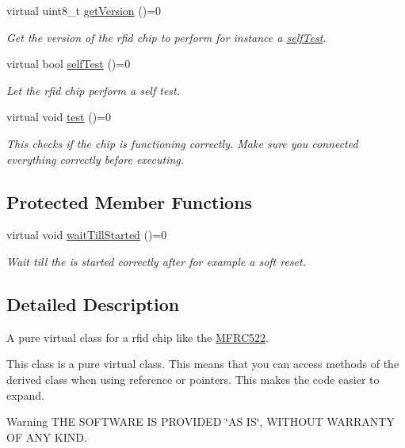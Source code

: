 \begin{DoxyCompactItemize}
virtual uint8\+\_\+t \mbox{\hyperlink{classrfid_a27619628e718bb781f912aead770079a}{get\+Version}} ()=0
\begin{DoxyCompactList}\small\item\em Get the version of the rfid chip to perform for instance a \mbox{\hyperlink{classrfid_a93e5430380a14fd652e7ca1ce6443198}{self\+Test}}. \end{DoxyCompactList}\item 
virtual bool \mbox{\hyperlink{classrfid_a93e5430380a14fd652e7ca1ce6443198}{self\+Test}} ()=0
\begin{DoxyCompactList}\small\item\em Let the rfid chip perform a self test. \end{DoxyCompactList}\item 
virtual void \mbox{\hyperlink{classrfid_adc4009859b77330fd5b3d0515337ac40}{test}} ()=0
\begin{DoxyCompactList}\small\item\em This checks if the chip is functioning correctly. Make sure you connected everything correctly before executing. \end{DoxyCompactList}\end{DoxyCompactItemize}
\subsection*{Protected Member Functions}
\begin{DoxyCompactItemize}
\item 
\mbox{\label{classrfid_aa8c64df0877a6bad52b08cfdcaea02bc}} 
virtual void \mbox{\hyperlink{classrfid_aa8c64df0877a6bad52b08cfdcaea02bc}{wait\+Till\+Started}} ()=0
\begin{DoxyCompactList}\small\item\em Wait till the is started correctly after for example a soft reset. \end{DoxyCompactList}\end{DoxyCompactItemize}


\subsection{Detailed Description}
A pure virtual class for a rfid chip like the \mbox{\hyperlink{class_m_f_r_c522}{M\+F\+R\+C522}}. 

This class is a pure virtual class. This means that you can access methods of the derived class when using reference or pointers. This makes the code easier to expand. \begin{DoxyWarning}{Warning}
T\+HE S\+O\+F\+T\+W\+A\+RE IS P\+R\+O\+V\+I\+D\+ED \char`\"{}\+A\+S I\+S\char`\"{}, W\+I\+T\+H\+O\+UT W\+A\+R\+R\+A\+N\+TY OF A\+NY K\+I\+ND. 
\end{DoxyWarning}


